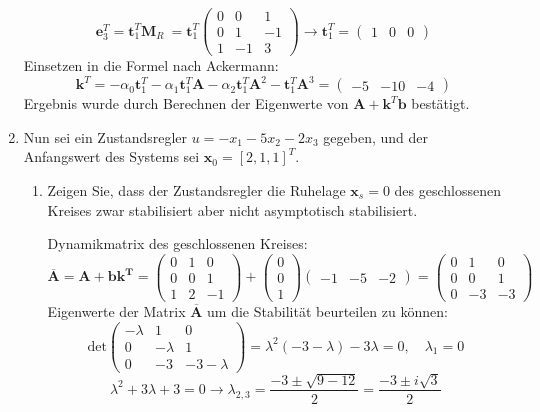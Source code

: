 \documentclass[crop=false]{standalone}
\begin{document}
\begin{task}
\begin{enumerate}[i]
\begin{solution}
\[\mathbf{e}^T_3 = \mathbf{t}_1^T \mathbf{M}_R\ = \mathbf{t}_1^T \begin{pmatrix}
0 & 0 & 1\\
0 & 1 & -1\\
1 & -1& 3
\end{pmatrix} \rightarrow \mathbf{t}_1^T = \begin{pmatrix}
1&0 &0
\end{pmatrix}\]
Einsetzen in die Formel nach Ackermann:
\[
\mathbf{k}^T = -\alpha_0 \mathbf{t}_1^T -\alpha_1 \mathbf{t}_1^T \mathbf{A} -\alpha_2 \mathbf{t}_1^T \mathbf{A}^2 - \mathbf{t}_1^T \mathbf{A}^3 = \begin{pmatrix}
-5&-10 &-4
\end{pmatrix}
\]
Ergebnis wurde durch Berechnen der Eigenwerte von $\mathbf{A}+\mathbf{k}^T \mathbf{b}$ bestätigt.
\end{solution}
\item Nun sei ein Zustandsregler $u=-x_{1}-5 x_{2}-2 x_{3}$ gegeben, und der Anfangswert
des Systems sei $\mathbf{x}_{0}=[2,1,1]^{T}$.
\begin{enumerate}[A]
    \item Zeigen Sie, dass der Zustandsregler die Ruhelage $\mathbf{x}_{s}=0$ des geschlossenen
Kreises zwar stabilisiert aber nicht asymptotisch stabilisiert.
\begin{solution}
Dynamikmatrix des geschlossenen Kreises:
\[\overline{\mathbf{A}} = \mathbf{A} + \mathbf{b \mathbf{k}^T} = 
\begin{pmatrix}
0&1&0\\
0&0&1\\
1&2&-1
\end{pmatrix}+
\begin{pmatrix}
0\\
0\\
1
\end{pmatrix}
\begin{pmatrix}
-1 & -5 & -2
\end{pmatrix}
=
\begin{pmatrix}
0&1&0\\
0&0&1\\
0&-3&-3
\end{pmatrix}
\]
Eigenwerte der Matrix $\overline{\mathbf{A}}$ um die Stabilität beurteilen zu können:
\[\text{det}
\begin{pmatrix}
-\lambda&1&0\\
0&-\lambda&1\\
0&-3&-3-\lambda
\end{pmatrix}=\lambda^2 \left( -3 -\lambda \right) - 3\lambda =0, \quad \lambda_1 = 0\]
\[\lambda^2 + 3\lambda +3 = 0 \rightarrow \lambda_{2,3} = \frac{-3 \pm \sqrt{9 - 12}}{2} = \frac{-3 \pm i\sqrt{3}}{2} \]


\end{solution}
\end{enumerate}
\end{enumerate}
\end{task}
\end{document}
